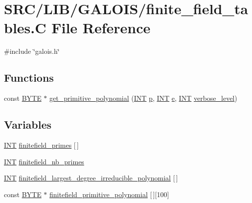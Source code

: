 \hypertarget{finite__field__tables_8_c}{}\section{S\+R\+C/\+L\+I\+B/\+G\+A\+L\+O\+I\+S/finite\+\_\+field\+\_\+tables.C File Reference}
\label{finite__field__tables_8_c}
{\ttfamily \#include \char`\"{}galois.\+h\char`\"{}}\newline
\subsection*{Functions}
\begin{DoxyCompactItemize}
\item 
const \mbox{\hyperlink{galois_8h_ab6cc7b4aeb6ea31aba2b3fbfc83ff5e6}{B\+Y\+TE}} $\ast$ \mbox{\hyperlink{finite__field__tables_8_c_a208ece81c99403683f588d02defd74a7}{get\+\_\+primitive\+\_\+polynomial}} (\mbox{\hyperlink{galois_8h_a09fddde158a3a20bd2dcadb609de11dc}{I\+NT}} \mbox{\hyperlink{alphabet2_8_c_a533391314665d6bf1b5575e9a9cd8552}{p}}, \mbox{\hyperlink{galois_8h_a09fddde158a3a20bd2dcadb609de11dc}{I\+NT}} \mbox{\hyperlink{alphabet2_8_c_a88859ce72faebb79ea0a2bca00a0f46b}{e}}, \mbox{\hyperlink{galois_8h_a09fddde158a3a20bd2dcadb609de11dc}{I\+NT}} \mbox{\hyperlink{simeon_8_c_a818073fbcc2f439e7c56952f67386122}{verbose\+\_\+level}})
\end{DoxyCompactItemize}
\subsection*{Variables}
\begin{DoxyCompactItemize}
\item 
\mbox{\hyperlink{galois_8h_a09fddde158a3a20bd2dcadb609de11dc}{I\+NT}} \mbox{\hyperlink{finite__field__tables_8_c_ab55bce60e8736e8250d0c8e47e118591}{finitefield\+\_\+primes}} \mbox{[}$\,$\mbox{]}
\item 
\mbox{\hyperlink{galois_8h_a09fddde158a3a20bd2dcadb609de11dc}{I\+NT}} \mbox{\hyperlink{finite__field__tables_8_c_abc07f79c0ab4221c5ca961123d02a550}{finitefield\+\_\+nb\+\_\+primes}}
\item 
\mbox{\hyperlink{galois_8h_a09fddde158a3a20bd2dcadb609de11dc}{I\+NT}} \mbox{\hyperlink{finite__field__tables_8_c_a0e4aff37b507acf16f8e6461be1fac67}{finitefield\+\_\+largest\+\_\+degree\+\_\+irreducible\+\_\+polynomial}} \mbox{[}$\,$\mbox{]}
\item 
const \mbox{\hyperlink{galois_8h_ab6cc7b4aeb6ea31aba2b3fbfc83ff5e6}{B\+Y\+TE}} $\ast$ \mbox{\hyperlink{finite__field__tables_8_c_ac83e19774cc0f841948d6ebdada63d04}{finitefield\+\_\+primitive\+\_\+polynomial}} \mbox{[}$\,$\mbox{]}\mbox{[}100\mbox{]}
\end{DoxyCompactItemize}


